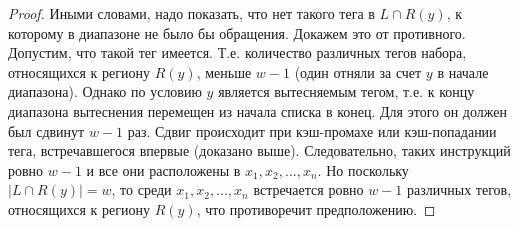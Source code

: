 \begin{proof}
  Иными словами, надо показать, что нет такого тега в $L \cap R(y)$,
  к которому в диапазоне не было бы обращения. Докажем это от противного.
  Допустим, что такой тег имеется. Т.е. количество различных тегов набора,
  относящихся к региону $R(y)$, меньше $w-1$ (один отняли за счет $y$ в начале диапазона).
  Однако по условию $y$ является вытесняемым тегом, т.е. к
  концу диапазона вытеснения перемещен из начала списка в конец. Для
  этого он должен был сдвинут $w-1$ раз. Сдвиг происходит при
  кэш-промахе или кэш-попадании тега, встречавшегося впервые
  (доказано выше). Следовательно, таких инструкций ровно $w-1$ и все они расположены
  в $x_1, x_2, ..., x_n$. Но поскольку $| L \cap R(y) | = w$, то
  среди $x_1, x_2, ..., x_n$ встречается ровно $w-1$ различных
  тегов, относящихся к региону $R(y)$, что противоречит
  предположению.
\end{proof}

